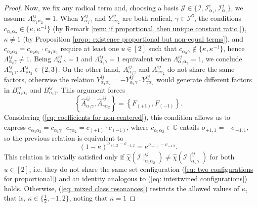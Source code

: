 \documentclass[10pt]{article}
\theoremstyle{remark}%
\theoremstyle{definition}%
\begin{document}
\begin{proof}
Now, we fix any radical term and, choosing a basis $\mathcal{J}\in\{\mathcal{I},\mathcal{I}_{\alpha_{1}}^{i},\mathcal{I}_{\alpha_{1}}^{j}\}$, we assume $\Lambda_{\alpha_{1}\alpha_{2}}^{ij}=1$. When $Y_{\alpha_{1}\gamma}^{ij}$ and $Y_{\gamma\alpha_{2}}^{ij}$ are both radical, $\gamma\in\mathcal{I}^{\mathtt{C}}$, the conditions $c_{\alpha_{1}\alpha_{2}}\in\{\kappa,\kappa^{-1}\}$ (by Remark \ref{rem: if proportional, then unique constant ratio }), $\kappa\neq 1$ (by Proposition \ref{prop: existence proportional but non-equal terms}), and $c_{\alpha_{2}\alpha_{3}}=c_{\alpha_{2}\alpha_{1}}\cdot c_{\alpha_{1}\alpha_{3}}$ require at least one $u\in[2]$ such that $c_{\alpha_{u}\gamma}\notin\{\kappa,\kappa^{-1}\}$, hence $\Lambda_{\alpha_{u}\gamma}^{ij}\neq 1$. Being $\Lambda_{\alpha_{1}\gamma}^{ij}=1$ and $\Lambda_{\alpha_{2}\gamma}^{ij}=1$ equivalent when $\Lambda_{\alpha_{1}\alpha_{2}}^{ij}=1$, we conclude $\Lambda_{\alpha_{1}\gamma}^{ij},\Lambda_{\gamma\alpha_{2}}^{ij}\in\{2,3\}$. On the other hand, $A_{\alpha_{1}\gamma}^{ij}$ and $A_{\gamma\alpha_{2}}^{ij}$ do not share the same factors, otherwise the relation $Y_{\alpha_{1}\alpha_{2}}^{ij}=-Y_{\alpha_{1}\gamma}^{ij}\cdot Y_{\gamma\alpha_{2}}^{ij}$ would generate different factors in $B_{\alpha_{1}\alpha_{2}}^{ij}$ and $B_{\alpha_{1}\gamma}^{ij}$. This argument forces 
\begin{equation}
\left\{\hat{A}_{\alpha_{1}\gamma}^{ij},\hat{A}_{\gamma\alpha_{2}}^{ij}\right\}=\left\{F_{(+1)},F_{(-1)}\right\}.
\label{eq: covering F-factors}
\end{equation}  %
Considering (\ref{eq: coefficients for non-centered}), this condition allows us to express $c_{\alpha_{1}\alpha_{2}}=c_{\alpha_{1}\gamma}\cdot c_{\gamma\alpha_{2}}=c_{(+1)}\cdot c_{(-1)}$, where  $c_{\alpha_{1}\alpha_{2}}\in\mathbb{C}$ entails   $\sigma_{+1,1}=-\sigma_{-1,1}$, so the previous relation is equivalent to   
\begin{equation}
(1-\kappa)^{\sigma_{+1,2}-\sigma_{-1,2}}=\kappa^{\sigma_{-1,1}-\sigma_{-1.2}}.
\label{eq: mixed class resonances}
\end{equation}
This relation is trivially satisfied only if $\hat{\chi}(\mathcal{I}\mid_{\alpha_{1}\alpha_{2}}^{ij})\neq\hat{\chi}(\mathcal{I}\mid _{\alpha_{u}\gamma}^{ij})$ for both $u\in[2]$, i.e. they do not share the same set configuration (\ref{eq: two configurations for proportional}) and an identity analogous to (\ref{eq: intertwined configurations}) holds. Otherwise, (\ref{eq: mixed class resonances}) restricts the allowed values of $\kappa$, that is, $\kappa\in\{\frac{1}{2},-1,2\}$, noting that $\kappa=1$ 

\end{proof}
\end{document}
